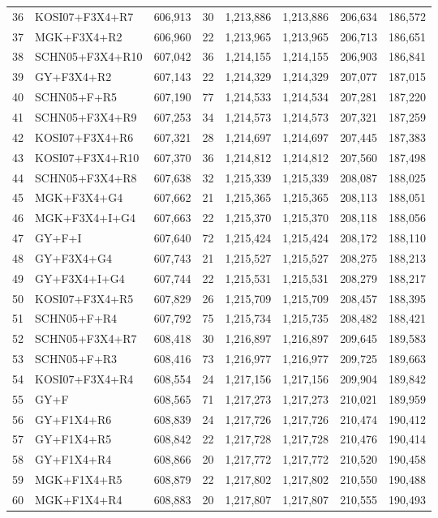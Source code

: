 \begin{longtable}{rlrrrrrr}
36&KOSI07+F3X4+R7&606,913&30&1,213,886&1,213,886&206,634&186,572\\
37&MGK+F3X4+R2&606,960&22&1,213,965&1,213,965&206,713&186,651\\
38&SCHN05+F3X4+R10&607,042&36&1,214,155&1,214,155&206,903&186,841\\
39&GY+F3X4+R2&607,143&22&1,214,329&1,214,329&207,077&187,015\\
40&SCHN05+F+R5&607,190&77&1,214,533&1,214,534&207,281&187,220\\
41&SCHN05+F3X4+R9&607,253&34&1,214,573&1,214,573&207,321&187,259\\
42&KOSI07+F3X4+R6&607,321&28&1,214,697&1,214,697&207,445&187,383\\
43&KOSI07+F3X4+R10&607,370&36&1,214,812&1,214,812&207,560&187,498\\
44&SCHN05+F3X4+R8&607,638&32&1,215,339&1,215,339&208,087&188,025\\
45&MGK+F3X4+G4&607,662&21&1,215,365&1,215,365&208,113&188,051\\
46&MGK+F3X4+I+G4&607,663&22&1,215,370&1,215,370&208,118&188,056\\
47&GY+F+I&607,640&72&1,215,424&1,215,424&208,172&188,110\\
48&GY+F3X4+G4&607,743&21&1,215,527&1,215,527&208,275&188,213\\
49&GY+F3X4+I+G4&607,744&22&1,215,531&1,215,531&208,279&188,217\\
50&KOSI07+F3X4+R5&607,829&26&1,215,709&1,215,709&208,457&188,395\\
51&SCHN05+F+R4&607,792&75&1,215,734&1,215,735&208,482&188,421\\
52&SCHN05+F3X4+R7&608,418&30&1,216,897&1,216,897&209,645&189,583\\
53&SCHN05+F+R3&608,416&73&1,216,977&1,216,977&209,725&189,663\\
54&KOSI07+F3X4+R4&608,554&24&1,217,156&1,217,156&209,904&189,842\\
55&GY+F&608,565&71&1,217,273&1,217,273&210,021&189,959\\
56&GY+F1X4+R6&608,839&24&1,217,726&1,217,726&210,474&190,412\\
57&GY+F1X4+R5&608,842&22&1,217,728&1,217,728&210,476&190,414\\
58&GY+F1X4+R4&608,866&20&1,217,772&1,217,772&210,520&190,458\\
59&MGK+F1X4+R5&608,879&22&1,217,802&1,217,802&210,550&190,488\\
60&MGK+F1X4+R4&608,883&20&1,217,807&1,217,807&210,555&190,493\\

\end{longtable}
